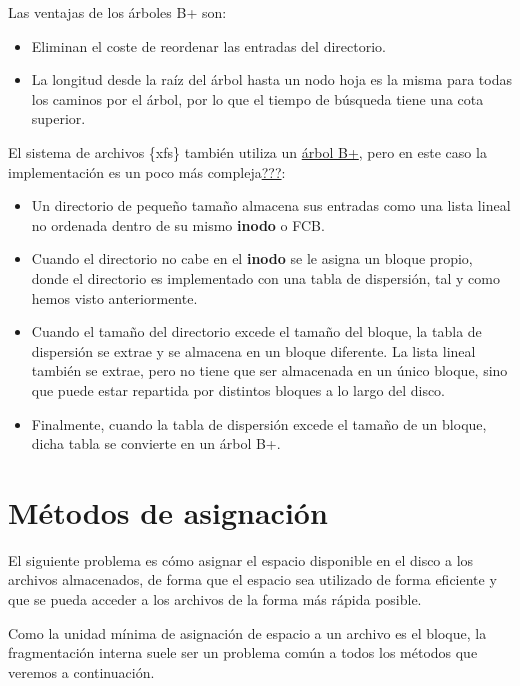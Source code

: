 Las ventajas de los árboles B+ son:

\begin{itemize}
\item
  Eliminan el coste de reordenar las entradas del directorio.
\item
  La longitud desde la raíz del árbol hasta un nodo hoja es la misma
  para todas los caminos por el árbol, por lo que el tiempo de búsqueda
  tiene una cota superior.
\end{itemize}

El sistema de archivos \{xfs\} también utiliza un
\href{https://es.wikipedia.org/wiki/\%C3\%81rbol_B\%2B}{árbol B+}, pero
en este caso la implementación es un poco más
compleja\hyperref[SGI2006]{???}:

\begin{itemize}
\item
  Un directorio de pequeño tamaño almacena sus entradas como una lista
  lineal no ordenada dentro de su mismo \textbf{inodo} o FCB.
\item
  Cuando el directorio no cabe en el \textbf{inodo} se le asigna un
  bloque propio, donde el directorio es implementado con una tabla de
  dispersión, tal y como hemos visto anteriormente.
\item
  Cuando el tamaño del directorio excede el tamaño del bloque, la tabla
  de dispersión se extrae y se almacena en un bloque diferente. La lista
  lineal también se extrae, pero no tiene que ser almacenada en un único
  bloque, sino que puede estar repartida por distintos bloques a lo
  largo del disco.
\item
  Finalmente, cuando la tabla de dispersión excede el tamaño de un
  bloque, dicha tabla se convierte en un árbol B+.
\end{itemize}

\section{Métodos de asignación}\label{_muxe9todos_de_asignaciuxf3n}

El siguiente problema es cómo asignar el espacio disponible en el disco
a los archivos almacenados, de forma que el espacio sea utilizado de
forma eficiente y que se pueda acceder a los archivos de la forma más
rápida posible.

Como la unidad mínima de asignación de espacio a un archivo es el
bloque, la fragmentación interna suele ser un problema común a todos los
métodos que veremos a continuación.

